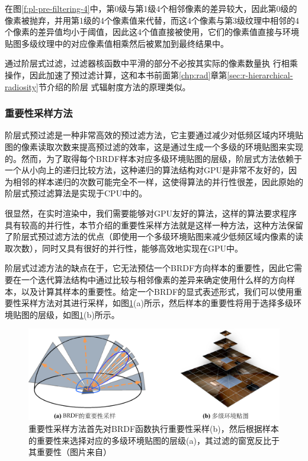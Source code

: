 在图\ref{f:pl-pre-filtering-4}中，第0级与第1级4个相邻像素的差异较大，因此第0级的 像素被抛弃，并用第1级的4个像素值来代替，而这4个像素与第3级纹理中相邻的4个像素的差异值均小于阈值，因此这4个值直接被使用，它们的像素值直接与环境贴图多级纹理中的对应像素值相乘然后被累加到最终结果中。

通过阶层式过滤，过滤器核函数中平滑的部分不必按其实际的像素数量执 行相乘操作，因此加速了预过滤计算，这和本书前面第\ref{chp:rad}章第\ref{sec:r-hierarchical-radiosity}节介绍的阶层 式辐射度方法的原理类似。



\subsubsection{重要性采样方法}
阶层式预过滤是一种非常高效的预过滤方法，它主要通过减少对低频区域内环境贴图的像素读取次数来提高预过滤的效率，这是通过生成一个多级的环境贴图来实现的。然而，为了取得每个BRDF样本对应多级环境贴图的层级，阶层式方法依赖于一个从小向上的递归比较方法，这种递归的算法结构对GPU是非常不友好的，因为相邻的样本递归的次数可能完全不一样，这使得算法的并行性很差，因此原始的阶层式预过滤算法\cite{a:FastArbitraryBRDFShadingforLowFrequencyLightingUsingSphericalHarmonics}是实现于CPU中的。

很显然，在实时渲染中，我们需要能够对GPU友好的算法，这样的算法要求程序具有较高的并行性，本节介绍的重要性采样方法\cite{a:Real-timeShadingwithFilteredImportanceSampling}就是这样一种方法，这种方法保留了阶层式预过滤方法的优点（即使用一个多级环境贴图来减少低频区域内像素的读取次数），同时又具有很好的并行性，能够高效地实现在GPU中。

阶层式过滤方法的缺点在于，它无法预估一个BRDF方向样本的重要性，因此它需要在一个迭代算法结构中通过比较与相邻像素的差异来确定使用什么样的方向样本，以及计算其样本的重要性。给定一个BRDF的显式表述形式，我们可以使用重要性采样方法对其进行采样，如图\ref{f:pl-importance-sampling}(a)所示，然后样本的重要性将用于选择多级环境贴图的层级，如图\ref{f:pl-importance-sampling}(b)所示。

\begin{figure}
	\includegraphics[width=\textwidth]{figures/pl/importance-sampling}
	\caption{重要性采样方法首先对BRDF函数执行重要性采样(b)，然后根据样本的重要性来选择对应的多级环境贴图的层级(a)，其过滤的窗宽反比于其重要性（图片来自\cite{a:Real-timeShadingwithFilteredImportanceSampling}）}
	\label{f:pl-importance-sampling}
\end{figure}

